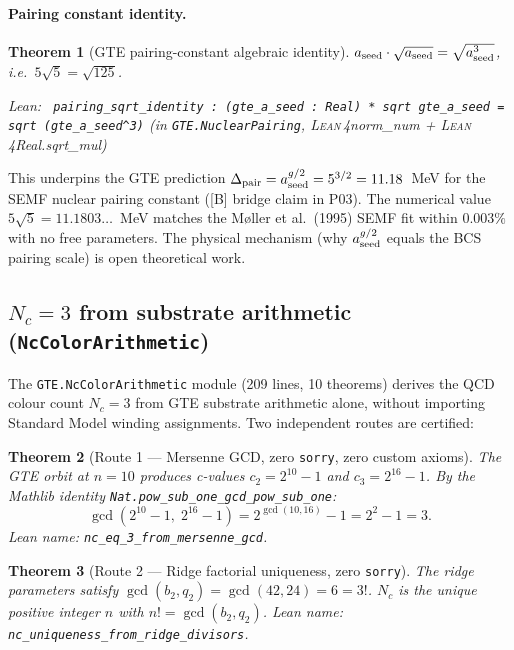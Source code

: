 \documentclass[11pt,a4paper]{article}
\newenvironment{leanref}%
  {\par\smallskip\noindent\begingroup\raggedright\textup{Lean:}~}%
  {\par\endgroup}
\newtheorem{theorem}{Theorem}[section]
\theoremstyle{definition}
\newcommand{\lean}{\textsc{Lean}\,4}
\begin{document}
\paragraph{Pairing constant identity.}
\begin{theorem}[GTE pairing-constant algebraic identity]\label{thm:pairing-sqrt}
$a_{\rm seed} \cdot \sqrt{a_{\rm seed}} = \sqrt{a_{\rm seed}^3}$, i.e.\ $5\sqrt{5} = \sqrt{125}$.
\begin{leanref}
\lstinline|pairing_sqrt_identity : (gte_a_seed : Real) * sqrt gte_a_seed = sqrt (gte_a_seed^3)|
\textup{(in \texttt{GTE.NuclearPairing}, \lean{norm\_num} + \lean{Real.sqrt\_mul})}
\end{leanref}
\end{theorem}

This underpins the GTE prediction $\Delta_{\rm pair} = a_{\rm seed}^{g/2} = 5^{3/2} = 11.18$~MeV
for the SEMF nuclear pairing constant ([B] bridge claim in P03).
The numerical value $5\sqrt{5} = 11.1803\ldots$~MeV matches the M\o ller et al.\
(1995) SEMF fit within $0.003\%$ with no free parameters.
The physical mechanism (why $a_{\rm seed}^{g/2}$ equals the BCS pairing scale)
is open theoretical work.

\subsection{$N_c = 3$ from substrate arithmetic (\texttt{NcColorArithmetic})}\label{subsec:nc-color-arith}

The \texttt{GTE.NcColorArithmetic} module (209 lines, 10 theorems) derives the QCD
colour count $N_c = 3$ from GTE substrate arithmetic alone, without importing
Standard Model winding assignments.  Two independent routes are certified:

\begin{theorem}[Route 1 — Mersenne GCD, zero \texttt{sorry}, zero custom axioms]
The GTE orbit at $n=10$ produces c-values $c_2 = 2^{10}-1$ and $c_3 = 2^{16}-1$.
By the Mathlib identity \lstinline|Nat.pow_sub_one_gcd_pow_sub_one|:
\[
\gcd(2^{10}-1,\;2^{16}-1) = 2^{\gcd(10,16)}-1 = 2^2 - 1 = 3.
\]
Lean name: \lstinline|nc_eq_3_from_mersenne_gcd|.
\end{theorem}

\begin{theorem}[Route 2 — Ridge factorial uniqueness, zero \texttt{sorry}]
The ridge parameters satisfy $\gcd(b_2, q_2) = \gcd(42, 24) = 6 = 3!$.
$N_c$ is the unique positive integer $n$ with $n! = \gcd(b_2, q_2)$.
Lean name: \lstinline|nc_uniqueness_from_ridge_divisors|.
\end{theorem}
\end{document}
